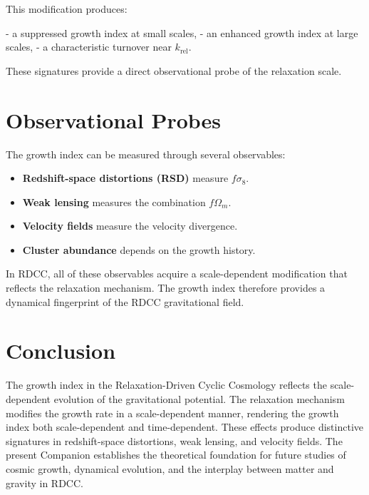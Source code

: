 \documentclass[11pt,a4paper]{article}
\begin{document}
This modification produces:

- a suppressed growth index at small scales,  
- an enhanced growth index at large scales,  
- a characteristic turnover near $k_{\mathrm{rel}}$.

These signatures provide a direct observational probe of the relaxation scale.
\section{Observational Probes}

The growth index can be measured through several observables:

\begin{itemize}
    \item \textbf{Redshift-space distortions (RSD)} measure $f\sigma_{8}$.
    \item \textbf{Weak lensing} measures the combination $f\Omega_{m}$.
    \item \textbf{Velocity fields} measure the velocity divergence.
    \item \textbf{Cluster abundance} depends on the growth history.
\end{itemize}

In RDCC, all of these observables acquire a scale-dependent modification that 
reflects the relaxation mechanism. The growth index therefore provides a 
dynamical fingerprint of the RDCC gravitational field.
\section{Conclusion}

The growth index in the Relaxation-Driven Cyclic Cosmology reflects the 
scale-dependent evolution of the gravitational potential. The relaxation mechanism 
modifies the growth rate in a scale-dependent manner, rendering the growth index 
both scale-dependent and time-dependent. These effects produce distinctive 
signatures in redshift-space distortions, weak lensing, and velocity fields. The 
present Companion establishes the theoretical foundation for future studies of 
cosmic growth, dynamical evolution, and the interplay between matter and gravity in 
RDCC.


\nocite{*}

\end{document}
